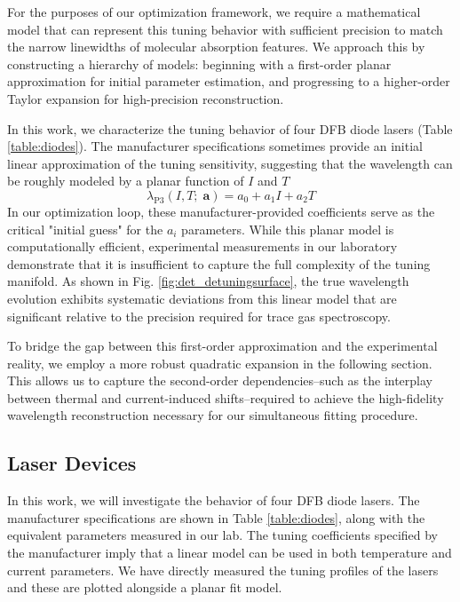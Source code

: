 \documentclass[8pt,a4paper]{report}
\begin{document}
	For the purposes of our optimization framework, we require a mathematical model that can represent this tuning behavior with sufficient precision to match the narrow linewidths of molecular absorption features. We approach this by constructing a hierarchy of models: beginning with a first-order planar approximation for initial parameter estimation, and progressing to a higher-order Taylor expansion for high-precision reconstruction.
	
	In this work, we characterize the tuning behavior of four DFB diode lasers (Table \ref{table:diodes}). The manufacturer specifications sometimes provide an initial linear approximation of the tuning sensitivity, suggesting that the wavelength can be roughly modeled by a planar function of $I$ and $T$
	\begin{equation} \label{det_plane_P3}
		\lambda_{\mathrm{P3}}(I, T;\;\mathbf{a}) = a_0 + a_1 I + a_2 T
	\end{equation}
	In our optimization loop, these manufacturer-provided coefficients serve as the critical "initial guess" for the $a_i$ parameters. While this planar model is computationally efficient, experimental measurements in our laboratory demonstrate that it is insufficient to capture the full complexity of the tuning manifold. As shown in Fig. \ref{fig:det_detuningsurface}, the true wavelength evolution exhibits systematic deviations from this linear model that are significant relative to the precision required for trace gas spectroscopy.
	
	To bridge the gap between this first-order approximation and the experimental reality, we employ a more robust quadratic expansion in the following section. This allows us to capture the second-order dependencies--such as the interplay between thermal and current-induced shifts--required to achieve the high-fidelity wavelength reconstruction necessary for our simultaneous fitting procedure.
	
	\subsection{Laser Devices}
	
	In this work, we will investigate the behavior of four DFB diode lasers. The manufacturer specifications are shown in Table \ref{table:diodes}, along with the equivalent parameters measured in our lab. The tuning coefficients specified by the manufacturer imply that a linear model can be used in both temperature and current parameters. We have directly measured the tuning profiles of the lasers and these are plotted alongside a planar fit model. 
	
\end{document}

